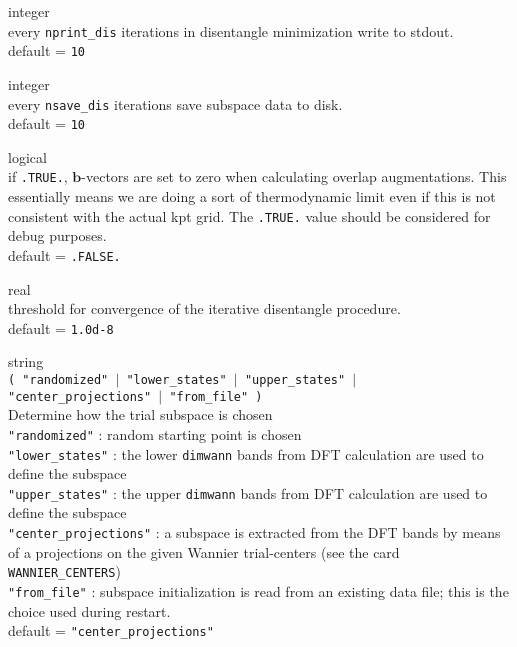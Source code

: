 {\noindent{}%
{\sc integer} \\  every {\tt nprint\_dis} iterations in disentangle minimization write to 
stdout.\\ {\sc default} = {\tt 10} \par

\noindent{}%
{\sc integer} \\  every {\tt nsave\_dis} iterations save subspace data to disk.\\ 
{\sc default} = {\tt 10} \par

\noindent{}%
{\sc logical} \\   if {\tt .TRUE.}, $\mathbf{b}$-vectors are set to zero 
when calculating overlap augmentations.
This essentially means we are doing a sort of thermodynamic limit
even if this is not consistent with the actual kpt grid. The {\tt .TRUE.} value
should be considered for debug purposes.\\ {\sc default} = {\tt .FALSE.} \par

\noindent{}%
{\sc real} \\  threshold for convergence of the iterative disentangle procedure.\\ 
{\sc default} = {\tt 1.0d-8} \par

\noindent{}%
{\sc string} \\  {\tt ( "randomized" $\mid$ "lower\_states" $\mid$ "upper\_states" $\mid$ \\
"center\_projections" $\mid$ "from\_file" ) }\\
Determine how the trial subspace is chosen\\
{\tt "randomized"}   : random starting point is chosen\\
{\tt "lower\_states"} : the lower {\tt dimwann} bands from DFT calculation are
                 used to define the subspace\\
{\tt "upper\_states"} : the upper {\tt dimwann} bands from DFT calculation are
                 used to define the subspace\\
{\tt "center\_projections"} : a subspace is extracted from the DFT bands
                 by means of a projections on the given Wannier trial-centers
                 (see the card {\tt WANNIER\_CENTERS})\\
{\tt "from\_file"} : subspace initialization is read from an existing data file;
                 this is the choice used during restart.\\
{\sc default} = {\tt "center\_projections"} \par

}
